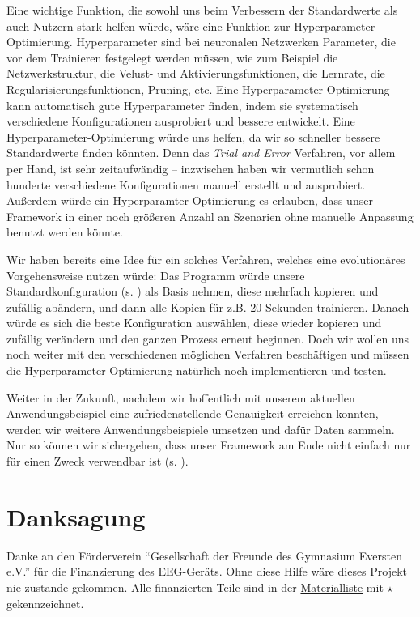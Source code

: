 \documentclass[10pt]{article}
\newcommand{\eng}[1]{\textit{#1}}
\begin{document}
Eine wichtige Funktion, die sowohl uns beim Verbessern der Standardwerte als auch Nutzern stark helfen würde, wäre eine Funktion zur Hyperparameter-Optimierung.
Hyperparameter sind bei neuronalen Netzwerken Parameter, die vor dem Trainieren festgelegt werden müssen, wie zum Beispiel die Netzwerkstruktur,  die Velust- und Aktivierungsfunktionen, die Lernrate, die Regularisierungsfunktionen, Pruning, etc. 
Eine Hyperparameter-Optimierung kann automatisch gute Hyperparameter finden, indem sie systematisch verschiedene Konfigurationen ausprobiert und bessere entwickelt.
Eine Hyperparameter-Optimierung würde uns helfen, da wir so schneller bessere Standardwerte finden könnten.
Denn das \eng{Trial and Error} Verfahren, vor allem per Hand, ist sehr zeitaufwändig -- inzwischen haben wir vermutlich schon hunderte verschiedene Konfigurationen manuell erstellt und ausprobiert.
Außerdem würde ein Hyperparamter-Optimierung es erlauben, dass unser Framework in einer noch größeren Anzahl an Szenarien ohne manuelle Anpassung benutzt werden könnte.

Wir haben bereits eine Idee für ein solches Verfahren, welches eine evolutionäres Vorgehensweise nutzen würde:
Das Programm würde unsere Standardkonfiguration (s. ) als Basis nehmen, diese mehrfach kopieren und zufällig abändern, und dann alle Kopien für z.B. 20 Sekunden trainieren.
Danach würde es sich die beste Konfiguration auswählen, diese wieder kopieren und zufällig verändern und den ganzen Prozess erneut beginnen.
Doch wir wollen uns noch weiter mit den verschiedenen möglichen Verfahren beschäftigen und müssen die Hyperparameter-Optimierung natürlich noch implementieren und testen.

Weiter in der Zukunft, nachdem wir hoffentlich mit unserem aktuellen Anwendungsbeispiel eine zufriedenstellende Genauigkeit erreichen konnten, werden wir weitere Anwendungsbeispiele umsetzen und dafür Daten sammeln.
Nur so können wir sichergehen, dass unser Framework am Ende nicht einfach nur für einen Zweck verwendbar ist (s. ).

\newpage

\section{Danksagung}

Danke an den Förderverein \enquote{Gesellschaft der Freunde des Gymnasium Eversten e.V.} für die Finanzierung des EEG-Geräts. Ohne diese Hilfe wäre dieses Projekt nie zustande gekommen. Alle finanzierten Teile sind in der \hyperref[Materialien]{Materialliste} mit $\star$ gekennzeichnet.
\end{document}
